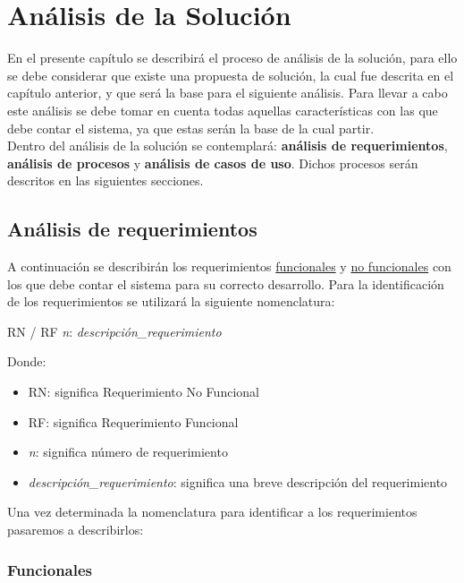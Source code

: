 \hypertarget{cv:analisisSolucion}{
	\chapter{Análisis de la Solución}
}

En el presente capítulo se describirá el proceso de análisis de la solución, para ello se debe considerar que existe una propuesta de solución, la cual fue descrita en el capítulo anterior, y que será la base para el siguiente análisis. Para llevar a cabo este análisis se debe tomar en cuenta todas aquellas características con las que debe contar el sistema, ya que estas serán la base de la cual partir. \\ 

Dentro del análisis de la solución se contemplará: \textbf{análisis de requerimientos}, \textbf{análisis de procesos} y \textbf{análisis de casos de uso}. Dichos procesos serán descritos en las siguientes secciones.

\section{Análisis de requerimientos}
A continuación se describirán los requerimientos \hyperlink{cv:funcionales}{funcionales} y \hyperlink{cv:noFuncionales}{no funcionales} con los que debe contar el sistema para su correcto desarrollo. Para la identificación de los requerimientos se utilizará la siguiente nomenclatura: 

\begin{center}
\Huge{RN / RF \textit{n}: \textit{descripción\_requerimiento}}
\end{center} 

Donde: 

\begin{itemize}
	\item RN: significa Requerimiento No Funcional
	\item RF: significa Requerimiento Funcional
	\item \textit{n}: significa número de requerimiento
	\item \textit{descripción\_requerimiento}: significa una breve descripción del requerimiento
\end{itemize}

Una vez determinada la nomenclatura para identificar a los requerimientos pasaremos a describirlos: 
\hypertarget{cv:funcionales}{\subsection{Funcionales}}

